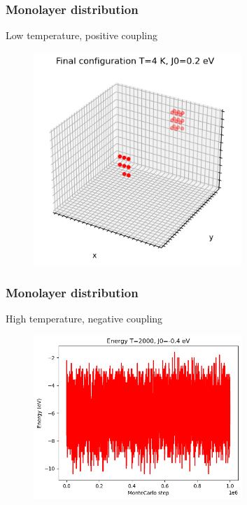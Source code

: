 \documentclass{beamer}
\begin{document}
\begin{frame}
    \frametitle{Monolayer distribution}

    \centering Low temperature, positive coupling

    \begin{figure}
        \includegraphics[width=0.7\textwidth]{images/erocco4.png}
    \end{figure}

\end{frame}
\begin{frame}
    \frametitle{Monolayer distribution}

    \centering High temperature, negative coupling

    \begin{figure}
        \includegraphics[width=0.7\textwidth]{images/erocco5.png}
    \end{figure}

\end{frame}
\end{document}
